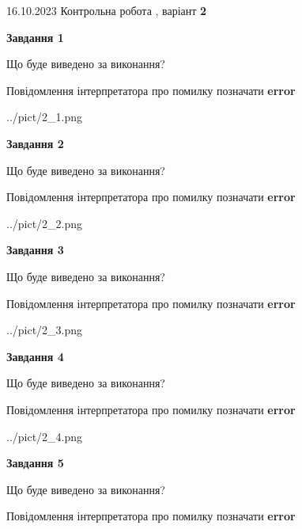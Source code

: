 \documentclass[12pt, ukrainian]{article}
\begin{document}
{\Large{16.10.2023 Контрольна робота , варіант  \No \textbf { 2 }\par}}
{
\begin {large}
{\begin {center}\textbf{Завдання 1}\end {center}}\par
Що буде виведено за виконання? \par
Повідомлення інтерпретатора про помилку позначати \textbf{error}

\begin{center}
	{../pict/2_1.png}
\end{center}
\newpage

{\begin {center}\textbf{Завдання 2}\end {center}}\par
Що буде виведено за виконання? \par
Повідомлення інтерпретатора про помилку позначати \textbf{error}

\begin{center}
	{../pict/2_2.png}
\end{center}
\newpage

{\begin {center}\textbf{Завдання 3}\end {center}}\par
Що буде виведено за виконання? \par
Повідомлення інтерпретатора про помилку позначати \textbf{error}

\begin{center}
	{../pict/2_3.png}
\end{center}
\newpage

{\begin {center}\textbf{Завдання 4}\end {center}}\par
Що буде виведено за виконання? \par
Повідомлення інтерпретатора про помилку позначати \textbf{error}

\begin{center}
	{../pict/2_4.png}
\end{center}
\newpage

{\begin {center}\textbf{Завдання 5}\end {center}}\par
Що буде виведено за виконання? \par
Повідомлення інтерпретатора про помилку позначати \textbf{error}


\end{large}}
\end{document}
